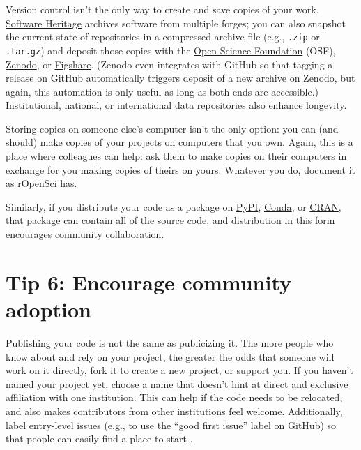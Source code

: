\documentclass[10pt,letterpaper]{article}
\begin{document}
Version control isn't the only way to create and save copies of your work.
\href{https://www.softwareheritage.org/how-to-archive-reference-code/}{Software Heritage} archives software from multiple forges;
you can also snapshot the current state of repositories in a compressed archive file
(e.g., \texttt{.zip} or \texttt{.tar.gz})
and deposit those copies with the \href{https://osf.io/}{Open Science Foundation} (OSF),
\href{https://zenodo.org/}{Zenodo},
or \href{https://figshare.com/}{Figshare}.
(Zenodo even integrates with GitHub so that tagging a release on GitHub
automatically triggers deposit of a new archive on Zenodo,
but again,
this automation is only useful as long as both ends are accessible.)
Institutional,
\href{https://amt.coretrustseal.org/certificates/}{national},
or \href{https://safeguar.de/}{international} data repositories also enhance longevity.

Storing copies on someone else's computer isn't the only option:
you can (and should) make copies of your projects on computers that you own.
Again,
this is a place where colleagues can help:
ask them to make copies on their computers in exchange for you making copies of theirs on yours.
Whatever you do,
document it \href{https://ropensci.org/blog/2022/03/22/safeguards-and-backups-for-github-organizations/}{as rOpenSci has}.

Similarly,
if you distribute your code as a package on \href{https://pypi.org/}{PyPI},
\href{https://anaconda.org/anaconda/conda}{Conda},
or \href{https://cran.r-project.org/}{CRAN},
that package can contain all of the source code,
and distribution in this form encourages community collaboration.

\section*{Tip 6: Encourage community adoption}

Publishing your code is not the same as publicizing it.
The more people who know about and rely on your project,
the greater the odds that someone will work on it directly,
fork it to create a new project,
or support you.
If you haven't named your project yet,
choose a name that doesn't hint at direct and exclusive affiliation with one institution.
This can help if the code needs to be relocated,
and also makes contributors from other institutions feel welcome.
Additionally,
label entry-level issues
(e.g., to use the ``good first issue'' label on GitHub)
so that people can easily find a place to start \cite{Steinmacher2015}.
\end{document}
